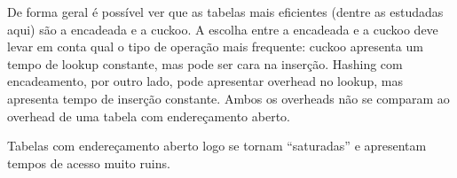 \documentclass{article}
\begin{document}
De forma geral é possível ver que as tabelas mais eficientes (dentre as estudadas aqui) são a
encadeada e a cuckoo. A escolha entre a encadeada e a cuckoo deve levar em conta qual o tipo de
operação mais frequente: cuckoo apresenta um tempo de lookup constante, mas pode ser cara na
inserção. Hashing com encadeamento, por outro lado, pode apresentar overhead no lookup, mas
apresenta tempo de inserção constante. Ambos os overheads não se comparam ao overhead de uma tabela
com endereçamento aberto.

Tabelas com endereçamento aberto logo se tornam ``saturadas'' e apresentam tempos de acesso muito
ruins.
\end{document}
